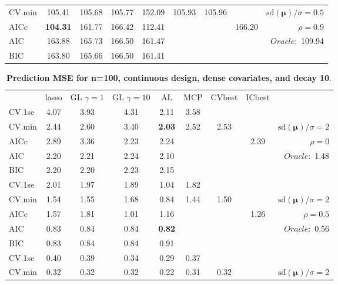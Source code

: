 \begin{table}
\begin{center}
\begin{tabular}{l*{7}{c}|r}
CV.min & 105.41 & 105.68 & 105.77 & 152.09 & 105.93 & 105.96 & & $\mathrm{sd}(\mathbf{\mu})/\sigma=0.5$ \\
AICc & {\bf 104.31} & 161.77 & 166.42 & 112.41 & & & 166.20 &  $\rho=0.9$ \\
AIC & 163.88 & 165.73 & 166.50 & 161.47 & & & &  \multirow{2}{*}{$Oracle: $ 109.94} \\
BIC & 163.80 & 165.66 & 166.50 & 161.41 & & & &  \\
 \hline 
\end{tabular}
\end{center}
\vspace{-1cm}
\end{table}




\clearpage
\begin{table}\vspace{-.5cm}
\caption[l]{ { \bf Prediction MSE for n=100, continuous design, 
dense covariates, and  decay  10}.}
\vspace{-.5cm}
\footnotesize{}
\begin{center}
\begin{tabular}{l*{7}{c}|r}
 & lasso & GL $\gamma=1$ & GL $\gamma=10$ & AL & MCP  & CVbest & ICbest  \\
\cline{1-9}
CV.1se & 4.07 & 3.93 & 4.31 & 2.11 & 3.58 & & & \\
CV.min & 2.44 & 2.60 & 3.40 & {\bf 2.03} & 2.52 & 2.53 & & $\mathrm{sd}(\mathbf{\mu})/\sigma=2$ \\
AICc & 2.89 & 3.36 & 2.23 & 2.24 & & & 2.39 &  $\rho=0$ \\
AIC & 2.20 & 2.21 & 2.24 & 2.10 & & & &  \multirow{2}{*}{$Oracle: $ 1.48} \\
BIC & 2.20 & 2.20 & 2.23 & 2.15 & & & &  \\
 \hline 
CV.1se & 2.01 & 1.97 & 1.89 & 1.04 & 1.82 & & & \\
CV.min & 1.54 & 1.55 & 1.68 & 0.84 & 1.44 & 1.50 & & $\mathrm{sd}(\mathbf{\mu})/\sigma=2$ \\
AICc & 1.57 & 1.81 & 1.01 & 1.16 & & & 1.26 &  $\rho=0.5$ \\
AIC & 0.83 & 0.84 & 0.84 & {\bf 0.82} & & & &  \multirow{2}{*}{$Oracle: $ 0.56} \\
BIC & 0.83 & 0.84 & 0.84 & 0.91 & & & &  \\
 \hline 
CV.1se & 0.40 & 0.39 & 0.34 & 0.29 & 0.37 & & & \\
CV.min & 0.32 & 0.32 & 0.32 & 0.22 & 0.31 & 0.32 & & $\mathrm{sd}(\mathbf{\mu})/\sigma=2$ \\

\end{tabular}
\end{center}
\end{table}
